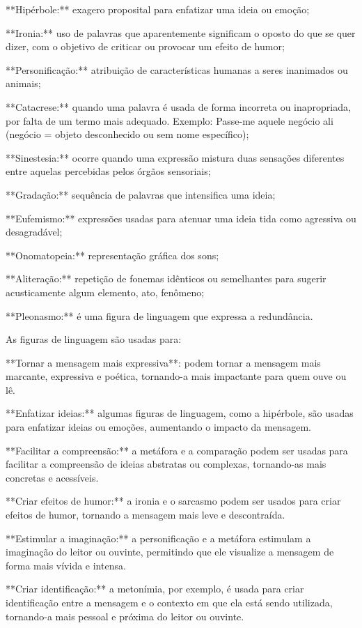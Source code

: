 {{**Hipérbole:** exagero proposital para enfatizar uma ideia ou emoção;

**Ironia:** uso de palavras que aparentemente significam o oposto do que
se quer dizer, com o objetivo de criticar ou provocar um efeito de
humor;

**Personificação:** atribuição de características humanas a seres
inanimados ou animais;

**Catacrese:** quando uma palavra é usada de forma incorreta ou
inapropriada, por falta de um termo mais adequado. Exemplo: Passe-me
aquele negócio ali (negócio = objeto desconhecido ou sem nome
específico);

**Sinestesia:** ocorre quando uma expressão mistura duas sensações
diferentes entre aquelas percebidas pelos órgãos sensoriais;

**Gradação:** sequência de palavras que intensifica uma ideia;

**Eufemismo:** expressões usadas para atenuar uma ideia tida como
agressiva ou desagradável;

**Onomatopeia:** representação gráfica dos sons;

**Aliteração:** repetição de fonemas idênticos ou semelhantes para
sugerir acusticamente algum elemento, ato, fenômeno;

**Pleonasmo:** é uma figura de linguagem que expressa a redundância.

As figuras de
linguagem são usadas para:

**Tornar a mensagem mais expressiva**: podem tornar a mensagem mais
marcante, expressiva e poética, tornando-a mais impactante para quem
ouve ou lê.

**Enfatizar ideias:** algumas figuras de linguagem, como a hipérbole,
são usadas para enfatizar ideias ou emoções, aumentando o impacto da
mensagem.

**Facilitar a compreensão:** a metáfora e a comparação podem ser usadas
para facilitar a compreensão de ideias abstratas ou complexas,
tornando-as mais concretas e acessíveis.

**Criar efeitos de humor:** a ironia e o sarcasmo podem ser usados para
criar efeitos de humor, tornando a mensagem mais leve e descontraída.

**Estimular a imaginação:** a personificação e a metáfora estimulam a
imaginação do leitor ou ouvinte, permitindo que ele visualize a mensagem
de forma mais vívida e intensa.

**Criar identificação:** a metonímia, por exemplo, é usada para criar
identificação entre a mensagem e o contexto em que ela está sendo
utilizada, tornando-a mais pessoal e próxima do leitor ou ouvinte.}

}
